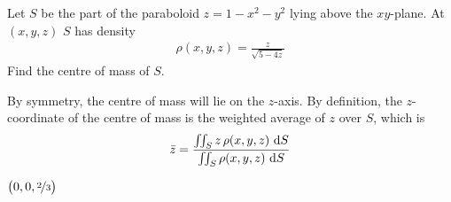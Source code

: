 \begin{question}[M317 2006A] %
Let $S$ be the part of the paraboloid $z=1-x^2-y^2$ lying above the 
$xy$-plane. At $(x,y,z)$ $S$ has density
\begin{align*}
\rho(x,y,z) = \frac{z}{\sqrt{5-4z}}
\end{align*} 
Find the centre of mass of $S$.
\end{question}

\begin{hint} 
By symmetry, the centre of mass will lie on the $z$-axis.
By definition, the $z$-coordinate of the centre of mass is the weighted
average of $z$ over $S$, which is
\begin{equation*}
\bar z = \frac{\iint_S z\,\rho(x,y,z)\ \mathrm{d}S}
              {\iint_S \rho(x,y,z)\ \mathrm{d}S}
\end{equation*}
\end{hint}

\begin{answer} 
$\big(0,0,\nicefrac{2}{3}\big)$
\end{answer}

